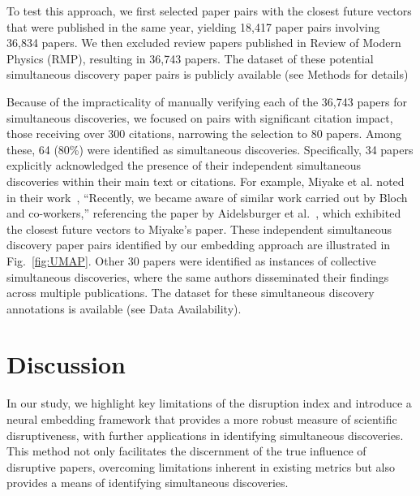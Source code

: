 \documentclass[12pt]{article}
\begin{document}
To test this approach, we first selected paper pairs with the closest future vectors that were published in the same year, yielding 18,417 paper pairs involving 36,834 papers. We then excluded review papers published in Review of Modern Physics (RMP), resulting in 36,743 papers. The dataset of these potential simultaneous discovery paper pairs is publicly available (see Methods for details)


Because of the impracticality of manually verifying each of the 36,743 papers for simultaneous discoveries, we focused on pairs with significant citation impact, those receiving over 300 citations, narrowing the selection to 80 papers. Among these, 64 (80\%) were identified as simultaneous discoveries. Specifically, 34 papers explicitly acknowledged the presence of their independent simultaneous discoveries within their main text or citations. For example, Miyake et al. noted in their work~\cite{miyake2013realizing}, ``Recently, we became aware of similar work carried out by Bloch and co-workers,'' referencing the paper by Aidelsburger et al.~\cite{aidelsburger2013realization}, which exhibited the closest future vectors to Miyake’s paper. These independent simultaneous discovery paper pairs identified by our embedding approach are illustrated in Fig.~\ref{fig:UMAP}. Other 30 papers were identified as instances of collective simultaneous discoveries, where the same authors disseminated their findings across multiple publications. The dataset for these simultaneous discovery annotations is available (see Data Availability). 




\section{Discussion}

In our study, we highlight key limitations of the disruption index and introduce a neural embedding framework that provides a more robust measure of scientific disruptiveness, with further applications in identifying simultaneous discoveries. This method not only facilitates the discernment of the true influence of disruptive papers, overcoming limitations inherent in existing metrics but also provides a means of identifying simultaneous discoveries.
\end{document}
